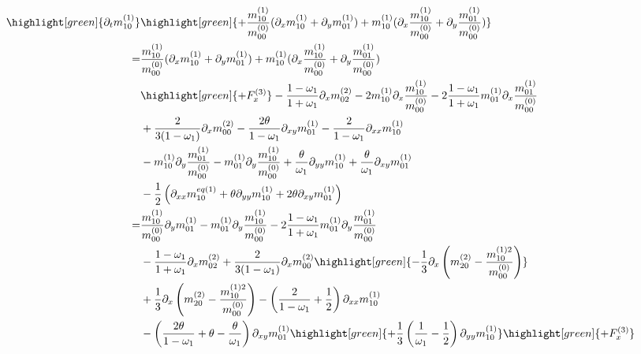 \documentclass{article}
\begin{document}
\begin{align*}
  \highlight[green]{
  \partial_t m_{10}^{(1)}}
  &
  \highlight[green]{+ \frac{m_{10}^{(1)}}{m_{00}^{(0)}} ( \partial_x m_{10}^{(1)} + \partial_y m_{01}^{(1)} )
  + m_{10}^{(1)} ( \partial_x \frac{m_{10}^{(1)}}{m_{00}^{(0)}} + \partial_y \frac{m_{01}^{(1)}}{m_{00}^{(0)}} )}
  \\=&
  \frac{m_{10}^{(1)}}{m_{00}^{(0)}} ( \partial_x m_{10}^{(1)} + \partial_y m_{01}^{(1)} )
  + m_{10}^{(1)} ( \partial_x \frac{m_{10}^{(1)}}{m_{00}^{(0)}} + \partial_y \frac{m_{01}^{(1)}}{m_{00}^{(0)}} )
  \\&
  \highlight[green]{
  + F_x^{(3)}
  }
  - \frac{1-\omega_1}{1+\omega_1} \partial_x m_{02}^{(2)}
  - 2 m_{10}^{(1)} \partial_x \frac{ m_{10}^{(1)} }{m_{00}^{(0)}}
  - 2 \frac{1-\omega_1}{1+\omega_1} m_{01}^{(1)}\partial_x\frac{m_{01}^{(1)}}{m_{00}^{(0)}}
  \\&
  + \frac{ 2}{3(1-\omega_1)} \partial_x m_{00}^{(2)}
  - \frac{2\theta}{1-\omega_1}\partial_{xy} m_{01}^{(1)}
  - \frac{2}{1-\omega_1}\partial_{xx} m_{10}^{(1)}
  \\&
  -m_{10}^{(1)}\partial_y \frac{ m_{01}^{(1)}}{m_{00}^{(0)}}
  -m_{01}^{(1)}\partial_y \frac{ m_{10}^{(1)}}{m_{00}^{(0)}}
  + \frac{\theta}{\omega_1}\partial_{yy} m_{10}^{(1)}
  + \frac{\theta}{\omega_1}\partial_{xy} m_{01}^{(1)}
  \\&
  - \frac{1}{2} \left(\partial_{xx} m_{10}^{eq(1)} + \theta\partial_{yy} m_{10}^{(1)} + 2\theta\partial_{xy} m_{01}^{(1)}\right)
  \\=&
    \frac{m_{10}^{(1)}}{m_{00}^{(0)}} \partial_y m_{01}^{(1)}
  - m_{01}^{(1)} \partial_y \frac{m_{10}^{(1)}}{m_{00}^{(0)}}
  - 2 \frac{1 - \omega_1}{1 + \omega_1} m_{01}^{(1)} \partial_y \frac{m_{01}^{(1)}}{m_{00}^{(0)}}
  \\&
  - \frac{1 - \omega_1}{1 + \omega_1} \partial_x m_{02}^{(2)}
  + \frac{2}{3(1-\omega_1)} \partial_x m_{00}^{(2)}
  \highlight[green]{
  - \frac{1}{3} \partial_x \left(m_{20}^{(2)} - \frac{m_{10}^{(1)2}}{m_{00}^{(0)}}\right)
  }
  \\&
  + \frac{1}{3} \partial_x \left(m_{20}^{(2)} - \frac{m_{10}^{(1)2}}{m_{00}^{(0)}}\right)
  - \left( \frac{2}{1-\omega_1} + \frac{1}{2}\right) \partial_{xx} m_{10}^{(1)}
  \\&
  - \left( \frac{2\theta}{1-\omega_1} +\theta- \frac{\theta}{\omega_1}\right) \partial_{xy} m_{01}^{(1)}
  \highlight[green]{
  + \frac{1}{3}\left( \frac{1}{\omega_1} - \frac{1}{2}\right) \partial_{yy} m_{10}^{(1)}
  }
  \highlight[green]{
  + F_x^{(3)}
}
\end{align*}
\end{document}
